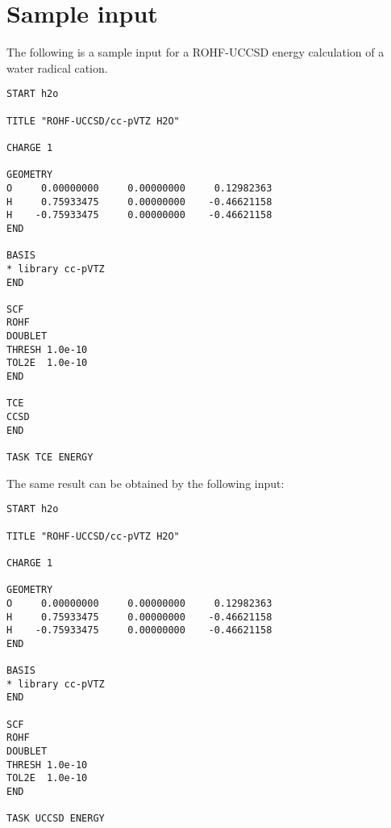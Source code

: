 \section{Sample input}

The following is a sample input for a ROHF-UCCSD energy calculation of a water radical cation.
\begin{verbatim}
START h2o

TITLE "ROHF-UCCSD/cc-pVTZ H2O"

CHARGE 1

GEOMETRY
O     0.00000000     0.00000000     0.12982363
H     0.75933475     0.00000000    -0.46621158
H    -0.75933475     0.00000000    -0.46621158
END

BASIS
* library cc-pVTZ
END

SCF
ROHF
DOUBLET
THRESH 1.0e-10
TOL2E  1.0e-10
END

TCE
CCSD
END

TASK TCE ENERGY
\end{verbatim}
The same result can be obtained by the following input:
\begin{verbatim}
START h2o

TITLE "ROHF-UCCSD/cc-pVTZ H2O"

CHARGE 1

GEOMETRY
O     0.00000000     0.00000000     0.12982363
H     0.75933475     0.00000000    -0.46621158
H    -0.75933475     0.00000000    -0.46621158
END

BASIS
* library cc-pVTZ
END

SCF
ROHF
DOUBLET
THRESH 1.0e-10
TOL2E  1.0e-10
END

TASK UCCSD ENERGY
\end{verbatim}
